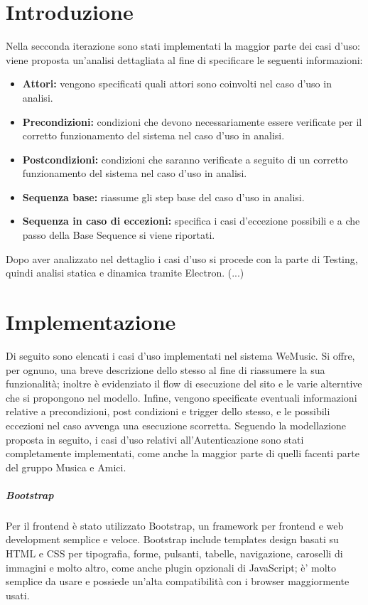\section{Introduzione}
Nella secconda iterazione sono stati implementati la maggior parte dei casi d'uso: viene proposta 
un'analisi dettagliata al fine di specificare le seguenti informazioni:
\begin{itemize}
    \item \textbf{Attori:} vengono specificati quali attori sono coinvolti nel caso d'uso in analisi.
    \item \textbf{Precondizioni:} condizioni che devono necessariamente essere verificate per il corretto funzionamento del sistema nel caso d'uso in analisi. 
    \item \textbf{Postcondizioni:} condizioni che saranno verificate a seguito di un corretto funzionamento del sistema nel caso d'uso in analisi. 
    \item \textbf{Sequenza base:} riassume gli step base del caso d'uso in analisi.
    \item \textbf{Sequenza in caso di eccezioni:} specifica i casi d'eccezione possibili e a che passo della Base Sequence si viene riportati. 
\end{itemize}

Dopo aver analizzato nel dettaglio i casi d'uso si procede con la parte di Testing, 
quindi analisi statica e dinamica tramite Electron. (...)


\newpage

\section{Implementazione}
Di seguito sono elencati i casi d'uso implementati nel sistema WeMusic. Si offre, per ognuno, una breve descrizione dello stesso 
al fine di riassumere la sua funzionalità; inoltre è evidenziato il flow di esecuzione del sito e le varie alterntive che si propongono nel modello.
Infine, vengono specificate eventuali informazioni relative a precondizioni, post condizioni e trigger dello stesso, e le possibili eccezioni nel 
caso avvenga una esecuzione scorretta. 
Seguendo la modellazione proposta in seguito, i casi d'uso relativi all'Autenticazione sono stati completamente implementati, come anche 
la maggior parte di quelli facenti parte del gruppo Musica e Amici. 
\subparagraph{Bootstrap}
Per il frontend è stato utilizzato Bootstrap, un framework per frontend e web development semplice e veloce. 
Bootstrap include templates design basati su HTML e CSS per tipografia, forme, pulsanti, tabelle, navigazione, caroselli di 
immagini e molto altro, come anche plugin opzionali di JavaScript; è' molto semplice da usare e possiede un'alta 
compatibilità con i browser maggiormente usati. 


